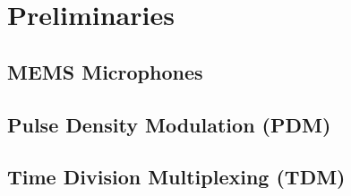 \chapter{Preliminaries}
\section{MEMS Microphones}

\section{Pulse Density Modulation (PDM)}

\section{Time Division Multiplexing (TDM)}
